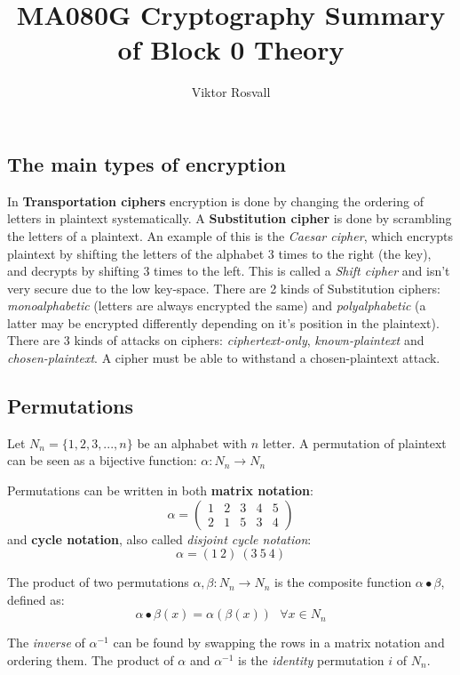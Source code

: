 \documentclass{article}
\title{MA080G Cryptography Summary of Block 0 Theory}
\author{Viktor Rosvall}
\begin{document}
	\maketitle
	\subsection*{The main types of encryption}
	In \textbf{Transportation ciphers} encryption is done by changing the ordering of letters in plaintext systematically. A \textbf{Substitution cipher} is done by scrambling the letters of a plaintext. An example of this is the \textit{Caesar cipher}, which encrypts plaintext by shifting the letters of the alphabet 3 times to the right (the key), and decrypts by shifting 3 times to the left. This is called a \textit{Shift cipher} and isn't very secure due to the low key-space. There are 2 kinds of Substitution ciphers: \textit{monoalphabetic} (letters are always encrypted the same) and \textit{polyalphabetic} (a latter may be encrypted differently depending on it’s position in the plaintext). There are 3 kinds of attacks on ciphers: \textit{ciphertext-only}, \textit{known-plaintext} and \textit{chosen-plaintext}. A cipher must be able to withstand a chosen-plaintext attack. 
	
	\subsection*{Permutations}
	Let $ N_{n} = \{1,2,3,...,n\} $ be an alphabet with $n$ letter.
	A permutation of plaintext can be seen as a bijective function: $ \alpha : N_{n} \to N_{n} $ 	

	Permutations can be written in both \textbf{matrix notation}:
	$$
	\alpha = 
	\begin{pmatrix}
	1 & 2 & 3 & 4 & 5 \\
	2 & 1 & 5 & 3 & 4
	\end{pmatrix}
	$$
	and \textbf{cycle notation}, also called \textit{disjoint cycle notation}:
	$$
	\alpha = (1 \ 2) \ (3 \ 5 \ 4)
	$$
	
	The product of two permutations $\alpha, \beta : N_n \to N_n$ is the composite function $\alpha \bullet \beta$, defined as:
	$$
	\alpha \bullet \beta(x) = \alpha(\beta(x)) \ \ \ \forall x \in N_n
	$$
	
	The \textit{inverse} of $\alpha^{-1}$ can be found by swapping the rows in a matrix notation and ordering them. The product of $\alpha$ and $\alpha^{-1}$ is the \textit{identity} permutation $i$ of $N_n$.
	
\end{document}
